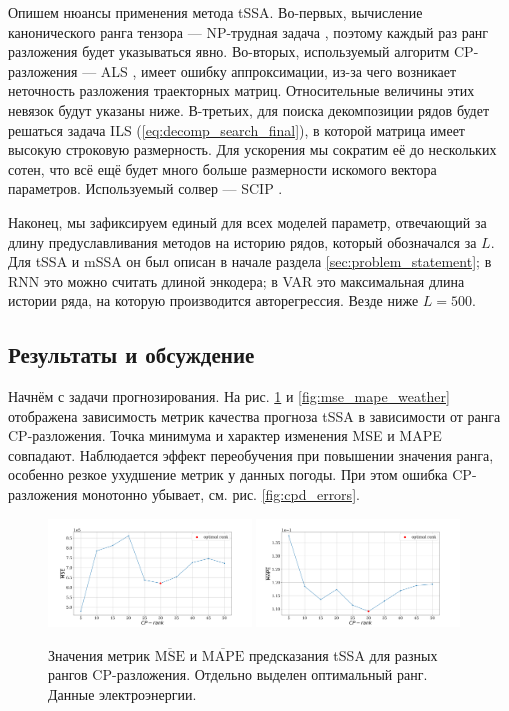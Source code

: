 	Опишем нюансы применения метода tSSA. Во-первых, вычисление канонического ранга тензора --- NP-трудная задача \cite{HASTAD1990644}, поэтому каждый раз ранг разложения будет указываться явно. Во-вторых, используемый алгоритм CP-разложения --- ALS \cite{kolda_tensors}, имеет ошибку аппроксимации, из-за чего возникает неточность разложения траекторных матриц. Относительные величины этих невязок будут указаны ниже. В-третьих, для поиска декомпозиции рядов будет решаться задача ILS (\ref{eq:decomp_search_final}), в которой матрица имеет высокую строковую размерность. Для ускорения мы сократим её до нескольких сотен, что всё ещё будет много больше размерности искомого вектора параметров. Используемый солвер --- SCIP \cite{BolusaniEtal2024ZR}.
	
	Наконец, мы зафиксируем единый для всех моделей параметр, отвечающий за длину предуславливания методов на историю рядов, который обозначался за $ L $. Для tSSA и mSSA он был описан в начале раздела \ref{sec:problem_statement}; в RNN это можно считать длиной энкодера; в VAR это максимальная длина истории ряда, на которую производится авторегрессия. Везде ниже $ L = 500 $.		
	
	\subsection*{Результаты и обсуждение}
	
	Начнём с задачи прогнозирования. На рис. \ref{fig:mse_mape_electr} и \ref{fig:mse_mape_weather} отображена зависимость метрик качества прогноза tSSA в зависимости от ранга CP-разложения. Точка минимума и характер изменения MSE и MAPE совпадают. Наблюдается эффект переобучения при повышении значения ранга, особенно резкое ухудшение метрик у данных погоды. При этом ошибка CP-разложения монотонно убывает, см. рис. \ref{fig:cpd_errors}.
	
	\begin{figure}[h]
		\centering
		\includegraphics[width=0.48\textwidth, keepaspectratio]{../../experiments/electricity/tssa/figs/prediction/MSE_rank.png}
		\includegraphics[width=0.48\textwidth, keepaspectratio]{../../experiments/electricity/tssa/figs/prediction/MAPE_rank.png}
		\caption{Значения метрик $ \overline{\text{MSE}} $ и $ \overline{\text{MAPE}} $ предсказания tSSA для разных рангов CP-разложения. Отдельно выделен оптимальный ранг. Данные электроэнергии.}\label{fig:mse_mape_electr}
	\end{figure}
	
